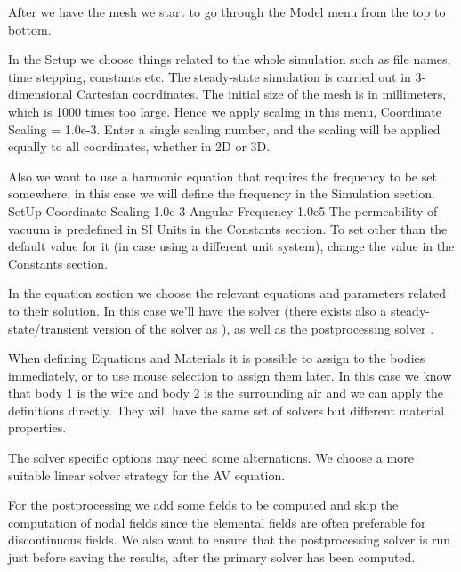 After we have the mesh we start to go through the Model menu from the top to bottom.

In the Setup we choose things related to the whole simulation such as file names, 
time stepping, constants etc.
The steady-state simulation is carried out in 3-dimensional Cartesian
coordinates. The initial size of the mesh is in millimeters, which is 1000 times too large. Hence we apply scaling in this menu, Coordinate Scaling = 1.0e-3.  Enter a single scaling number, and the scaling will be applied equally to all coordinates, whether in 2D or 3D.

Also we want to use a harmonic equation that requires the frequency to be set somewhere, in this case we will define the frequency in the Simulation section. 
\ttbegin
SetUp
  Coordinate Scaling 
    1.0e-3
  Angular Frequency
    1.0e5   
\ttend
The permeability of vacuum is predefined in SI Units in the Constants section. To set other than the default value for it (in case using a different unit system),
change the value in the Constants section.

In the equation section we choose the relevant equations and parameters related to their solution. 
In this case we'll have the \texttt{} solver (there exists also a steady-state/transient version of the solver
as \texttt{}), as well as the postprocessing solver \texttt{}.

When defining Equations and Materials it is possible to assign to the bodies immediately, or to use mouse
selection to assign them later. In this case we know that body 1 is the wire and body 2 is the surrounding air and we
can apply the definitions directly.
They will have the same set of solvers but different material properties. 

The solver specific options may need some alternations. We choose a more suitable
linear solver strategy for the AV equation. 

For the postprocessing we add some fields to be computed and skip the computation of nodal fields since the
elemental fields are often preferable for discontinuous fields. 
We also want to ensure that the postprocessing solver is run just before saving the results, after the primary solver has been computed.


